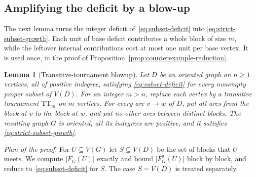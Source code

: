 \documentclass[11pt]{article}
\newtheorem{lemma}[theorem]{Lemma}
\theoremstyle{remark}
\newcommand{\abs}[1]{\lvert #1\rvert}
\newcommand{\TT}{\mathrm{TT}}
\begin{document}
\subsection{Amplifying the deficit by a blow-up}

The next lemma turns the integer deficit of~\eqref{eq:subset-deficit} into
\eqref{eq:strict-subset-growth}.  Each unit of base deficit contributes a
whole block of size $m$, while the leftover internal contributions cost at
most one unit per base vertex.  It is used once, in the proof of
Proposition~\ref{prop:counterexample-reduction}.

\begin{lemma}[Transitive-tournament blowup]
\label{lem:blowup}
Let $D$ be an oriented graph on $n\ge1$ vertices, all of positive
indegree, satisfying \eqref{eq:subset-deficit} for every nonempty proper
subset of $V(D)$.  For an integer $m>n$, replace each vertex by a
transitive tournament $\TT_m$ on $m$ vertices.  For every arc $v\to w$ of $D$,
put all arcs from the block at $v$ to the block at $w$, and put no other
arcs between distinct blocks.  The resulting graph $G$ is oriented,
all its indegrees are positive, and it satisfies
\eqref{eq:strict-subset-growth}.
\end{lemma}

\emph{Plan of the proof.}  For $U\subseteq V(G)$ let $S\subseteq V(D)$ be the
set of blocks that $U$ meets.  We compute $\abs{F_G(U)}$ exactly and bound
$\abs{F_G^2(U)}$ block by block, and reduce to~\eqref{eq:subset-deficit} for
$S$.  The case $S=V(D)$ is treated separately.
\end{document}
